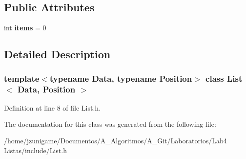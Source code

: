 \subsection*{Public Attributes}
\begin{DoxyCompactItemize}
\item 
\mbox{\label{class_list_aaedf2c01a4808437b1e02c75b591022a}} 
int {\bfseries items} = 0
\end{DoxyCompactItemize}


\subsection{Detailed Description}
\subsubsection*{template$<$typename Data, typename Position$>$\newline
class List$<$ Data, Position $>$}



Definition at line 8 of file List.\+h.



The documentation for this class was generated from the following file\+:\begin{DoxyCompactItemize}
\item 
/home/jzunigame/\+Documentos/\+A\+\_\+\+Algoritmos/\+A\+\_\+\+Git/\+Laboratorios/\+Lab4 Listas/include/List.\+h\end{DoxyCompactItemize}
